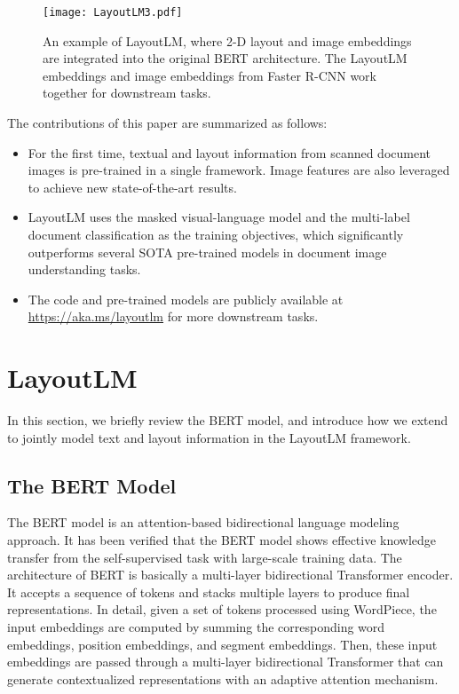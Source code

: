 \documentclass[sigconf]{acmart}
\begin{document}
\begin{figure*}[t]
    \centering
    \texttt{[image: LayoutLM3.pdf]}
    \caption{An example of LayoutLM, where 2-D layout and image embeddings are integrated into the original BERT architecture. The LayoutLM embeddings and image embeddings from Faster R-CNN work together for downstream tasks.}
    \label{fig:2}
\end{figure*}

The contributions of this paper are summarized as follows:
\begin{itemize}
    \item For the first time, textual and layout information from scanned document images is pre-trained in a single framework. Image features are also leveraged to achieve new state-of-the-art results. 
    \item LayoutLM uses the masked visual-language model and the multi-label document classification as the training objectives, which significantly outperforms several SOTA pre-trained models in document image understanding tasks.
    \item The code and pre-trained models are publicly available at \url{https://aka.ms/layoutlm} for more downstream tasks.
\end{itemize}
 
\section{LayoutLM}
In this section, we briefly review the BERT model, and introduce how we extend to jointly model text and layout information in the LayoutLM framework.

\subsection{The BERT Model}





The BERT model is an attention-based bidirectional language modeling approach. It has been verified that the BERT model shows effective knowledge transfer from the self-supervised task with large-scale training data.
The architecture of BERT is basically a multi-layer bidirectional Transformer encoder. It accepts a sequence of tokens and stacks multiple layers to produce final representations. In detail, given a set of tokens processed using WordPiece, the input embeddings are computed by summing the corresponding word embeddings, position embeddings, and segment embeddings. Then, these input embeddings are passed through a multi-layer bidirectional Transformer that can generate contextualized representations with an adaptive attention mechanism.
\end{document}
